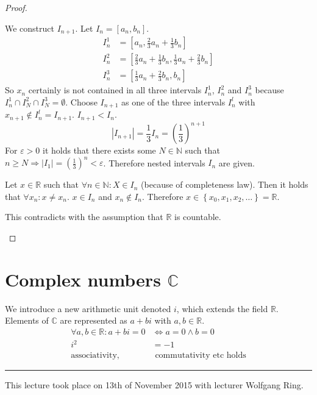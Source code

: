 \documentclass[a4paper,landscape,twocolumn]{article}
\theoremstyle{definition}
\newcommand\set[1]{\left\{#1\right\}}
\newcommand\abs[1]{\left|#1\right|}
\newcommand\meta[3]{\hrule{} This #1 took place on #2 with lecturer #3.\par}
\begin{document}
\begin{proof}
\begin{description}
      We construct $I_{n+1}$. Let $I_n = [a_n, b_n]$.
      \begin{align*}
        I_n^1 &= \left[a_n, \frac23 a_n + \frac13 b_n\right] \\
        I_n^2 &= \left[\frac23 a_n + \frac13 b_n, \frac13 a_n + \frac23 b_n\right] \\
        I_n^3 &= \left[\frac13 a_n + \frac23 b_n, b_n\right]
      \end{align*}
      So $x_n$ certainly is not contained in all three intervals $I_n^1$, $I_n^2$
      and $I_n^3$ because $I_n^1 \cap I_N^2 \cap I_N^3 = \emptyset$.
      Choose $I_{n+1}$ as one of the three intervals $I_n^l$ with $x_{n+1} \not\in I_n^l = I_{n+1}$.
      $I_{n+1} < I_n$.
      \[ \abs{I_{n+1}} = \frac13 I_{n} = \left(\frac13\right)^{n+1} \]
      For $\varepsilon > 0$ it holds that there exists some $N \in \mathbb N$
      such that $n \geq N \Rightarrow \abs{I_1} = \left(\frac13\right)^n < \varepsilon$.
      Therefore nested intervals $I_n$ are given.

      Let $x \in \mathbb R$ such that $\forall n \in \mathbb N: X \in I_n$
      (because of completeness law). Then it holds that $\forall x_n: x \neq x_n$.
      $x \in I_n$ and $x_n \not\in I_n$.
      Therefore $x \in \set{x_0, x_1, x_2, \ldots} = \mathbb R$.

      This contradicts with the assumption that $\mathbb R$ is countable.
  \end{description}
\end{proof}

\section[Complex numbers]{Complex numbers $\mathbb C$}

We introduce a new arithmetic unit denoted $i$, which extends the field $\mathbb R$.
Elements of $\mathbb C$ are represented as $a + bi$ with $a,b \in \mathbb R$.
\begin{align}
  \forall a, b \in \mathbb R: a + bi = 0 &\Leftrightarrow a = 0 \land b = 0 \\
  i^2 &= -1 \\
  \text{associativity,} & \text{ commutativity etc holds}
\end{align}

\meta{lecture}{13th of November 2015}{Wolfgang Ring}
\end{document}
